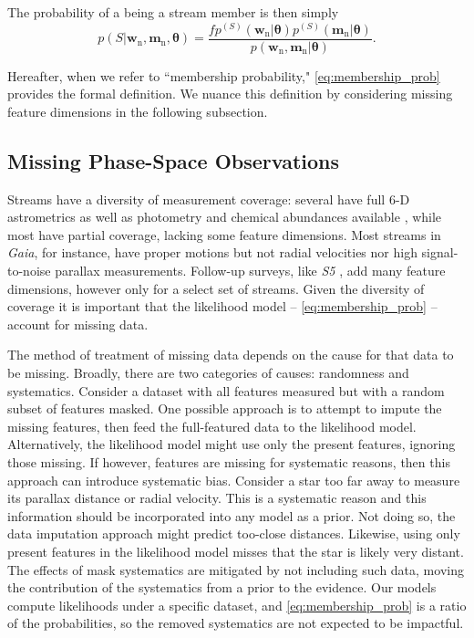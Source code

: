 \documentclass[twocolumn]{aastex631}
\newcommand{\dataarchive}[1]{\textit{#1}}
\newcommand{\Gaia}{\dataarchive{Gaia}}
\newcommand{\mrm}[1]{\mathrm{#1}}
\newcommand{\mbs}[1]{\boldsymbol{#1}}
\newcommand{\pdf}{p}
\newcommand{\nth}[1]{{#1}_{\mrm{n}}}  %
\newcommand{\smallcomponent}[2]{#2^{\scriptscriptstyle (#1)}}
\newcommand{\cmp}[2]{\smallcomponent{#1}{#2}}
\newcommand{\Scmp}[1]{\cmp{S}{#1}}
\newcommand{\Spdf}{\Scmp{\pdf}}
\begin{document}
        The probability of a being a stream member is then simply
        \begin{equation}\label{eq:membership_prob}
            \pdf\!\left(S | \nth{\mbs{w}}, \nth{\mbs{m}}, \mbs{\theta} \right)
            = \frac{f \Spdf(\nth{\mbs{w}}|\mbs{\theta}) \Spdf(\nth{\mbs{m}}|\mbs{\theta}) }{ \pdf(\nth{\mbs{w}}, \nth{\mbs{m}} | \mbs{\theta})}.
        \end{equation}

        Hereafter, when we refer to ``membership probability,"
        \autoref{eq:membership_prob} provides the formal definition. We nuance
        this definition by considering missing feature dimensions in the
        following subsection.

    \subsection{Missing Phase-Space Observations}
    \label{sub:method:missing_data}

        Streams have a diversity of measurement coverage: several have full 6-D
        astrometrics as well as photometry and chemical abundances available
        \citep[e.g.,][]{Koposov+2019, Antoja+2020, Li+2022}, while most have
        partial coverage, lacking some feature dimensions.  Most streams in
        \Gaia \citep{Gaia2016, Gaia2023}, for instance, have proper motions but
        not radial velocities nor high signal-to-noise parallax measurements.
        Follow-up surveys, like \dataarchive{S5} \citep{Li+2019}, add many
        feature dimensions, however only for a select set of streams. Given the
        diversity of coverage it is important that the likelihood model --
        \autoref{eq:membership_prob} -- account for missing data.

        The method of treatment of missing data depends on the cause for that
        data to be missing.  Broadly, there are two categories of causes:
        randomness and systematics.  Consider a dataset with all features
        measured but with a random subset of features masked.  One possible
        approach is to attempt to impute the missing features, then feed the
        full-featured data to the likelihood model. Alternatively, the
        likelihood model might use only the present features, ignoring those
        missing. If however, features are missing for systematic reasons, then
        this approach can introduce systematic bias. Consider a star too far
        away to measure its parallax distance or radial velocity. This is a
        systematic reason and this information should be incorporated into any
        model as a prior. Not doing so, the data imputation approach might
        predict too-close distances. Likewise, using only present features in
        the likelihood model misses that the star is likely very distant.  The
        effects of mask systematics are mitigated by not including such data,
        moving the contribution of the systematics from a prior to the evidence.
        Our models compute likelihoods under a specific dataset, and
        \autoref{eq:membership_prob} is a ratio of the probabilities, so the
        removed systematics are not expected to be impactful.
\end{document}
